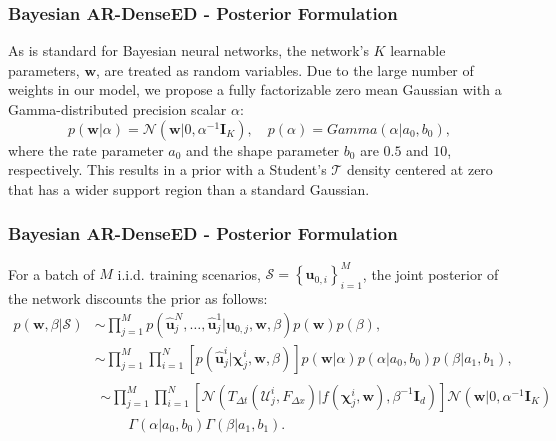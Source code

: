 \documentclass{beamer}
\theoremstyle{remark}
\begin{document}
\begin{frame}
\frametitle{Bayesian AR-DenseED - Posterior Formulation}
As is standard for Bayesian neural networks, the network's $K$ learnable parameters, $\textbf{w}$, are treated as random variables.
Due to the large number of weights in our model, we propose a fully factorizable zero mean Gaussian with a Gamma-distributed precision scalar $\alpha$:
\begin{equation}
    p\left(\mathbf{w}|\alpha\right)=\mathcal{N}\left(\mathbf{w}|0, \alpha^{-1}\bm{I}_{K}\right), \quad p\left(\alpha\right) = Gamma\left(\alpha|a_{0},b_{0}\right),
\end{equation}
where the rate parameter $a_{0}$ and the shape parameter $b_{0}$ are $0.5$ and $10$,  respectively.
This results in a prior with a Student's $\mathcal{T}$ density centered at zero that has a wider support region than a standard Gaussian.

\end{frame}

\begin{frame}
\frametitle{Bayesian AR-DenseED - Posterior Formulation}
For a batch of $M$ i.i.d. training scenarios, $\mathcal{S}=\left\{\bm{u}_{0,i}\right\}_{i=1}^{M}$, the joint posterior of the network discounts the prior as follows:
\begin{align}
    p\left(\textbf{w},\beta|\mathcal{S}\right) & \sim \prod^{M}_{j=1} p\left(\hat{\bm{u}}_{j}^{N}, \ldots, \hat{\bm{u}}_{j}^{1}|\bm{u}_{0,j},\textbf{w},\beta\right)p\left(\textbf{w}\right)p\left(\beta\right),  \nonumber \\ 
    & \sim \prod^{M}_{j=1}\prod_{i=1}^{N}\left[p\left(\hat{\bm{u}}_{j}^{i}|\bm{\chi}_{j}^{i},\textbf{w},\beta\right)\right]p\left(\textbf{w}|\alpha\right)p\left(\alpha|a_{0},b_{0}\right)p\left(\beta|a_{1},b_{1}\right),  \nonumber\\
    & \begin{multlined}\sim \prod^{M}_{j=1}\prod_{i=1}^{N} \left[\mathcal{N}\left(T_{\Delta t}\left(\bm{\mathcal{U}}_{j}^{i}, F_{\Delta x}\right)| f\left(\bm{\chi}_{j}^{i},\textbf{w}\right), \beta^{-1}\bm{I}_{d}\right)\right] \mathcal{N}\left(\mathbf{w}|0, \alpha^{-1}\bm{I}_{K}\right)\\
    \qquad \Gamma\left(\alpha| a_{0}, b_{0}\right) \Gamma\left(\beta|a_{1},b_{1}\right).
    \end{multlined}
    \label{eq:posterior-form}
\end{align}
\end{frame}
\end{document}
